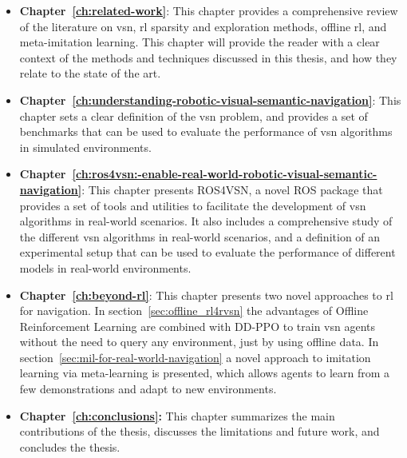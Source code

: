 \begin{itemize}
    \item \textbf{Chapter~\ref{ch:related-work}}: This chapter provides a comprehensive review of the literature on \acrshort{vsn}, \acrshort{rl} sparsity and exploration methods, offline \acrshort{rl}, and meta-imitation learning.
    This chapter will provide the reader with a clear context of the methods and techniques discussed in this thesis, and how they relate to the state of the art.
    \item \textbf{Chapter~\ref{ch:understanding-robotic-visual-semantic-navigation}}: This chapter sets a clear definition of the \acrshort{vsn} problem, and provides a set of benchmarks that can be used to evaluate the performance of \acrshort{vsn} algorithms in simulated environments.
    \item \textbf{Chapter~\ref{ch:ros4vsn:-enable-real-world-robotic-visual-semantic-navigation}}: This chapter presents ROS4VSN, a novel \acrshort{ROS} package that provides a set of tools and utilities to facilitate the development of \acrshort{vsn} algorithms in real-world scenarios.
    It also includes a comprehensive study of the different \acrshort{vsn} algorithms in real-world scenarios, and a definition of an experimental setup that can be used to evaluate the performance of different models in real-world environments.
    \item \textbf{Chapter~\ref{ch:beyond-rl}}: This chapter presents two novel approaches to \acrshort{rl} for navigation.
    In section~\ref{sec:offline_rl4rvsn} the advantages of Offline Reinforcement Learning are combined with DD-PPO to train \acrshort{vsn} agents without the need to query any environment, just by using offline data.
    In section~\ref{sec:mil-for-real-world-navigation} a novel approach to imitation learning via meta-learning is presented, which allows agents to learn from a few demonstrations and adapt to new environments.
    \item \textbf{Chapter~\ref{ch:conclusions}:} This chapter summarizes the main contributions of the thesis, discusses the limitations and future work, and concludes the thesis.
\end{itemize}